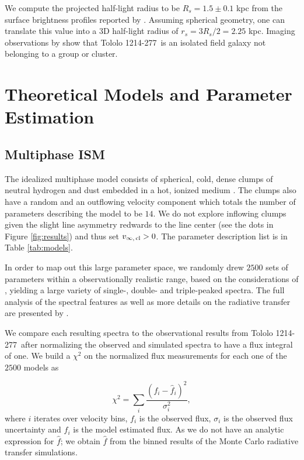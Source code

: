 \documentclass[a4paper,fleqn,usenatbib]{mnras}
\newcommand{\tol}{Tololo 1214-277}
\begin{document}
We compute the projected half-light radius to be $R_s=1.5\pm0.1$ kpc 
from the surface brightness profiles reported by \cite{2003A&A...410..481N}. 
Assuming spherical geometry, one can translate this value into a 3D
half-light radius of $r_s=3R_s/2=2.25$ kpc.
Imaging observations by \cite{2001AJ....121..169F} show that \tol\ is
an isolated field galaxy not belonging to a group or cluster. 






\section{Theoretical Models and Parameter Estimation}


\subsection{Multiphase ISM} 

The idealized multiphase model consists of spherical, cold, dense
clumps of neutral hydrogen and dust embedded in a hot, ionized
medium \citep{Gronke2016}. 
The clumps also have a random and an outflowing velocity
component which totals the number of parameters describing the model
to be $14$.
We do not explore inflowing clumps given the slight line asymmetry
redwards to the line center (see the dots in Figure \ref{fig:results})
and thus set $v_{\infty,\,{\rm cl}}>0$.
The parameter description list is in Table \ref{tab:models}.


In order to map out this large parameter space, we randomly drew
$2500$ sets of parameters within a observationally realistic range,
based on the considerations of \citet{Laursen2013ApJ...766..124L}, 
yielding a large variety of single-, double- and triple-peaked
spectra. 
The full analysis of the spectral features as well as
more details on the radiative transfer are presented by
\citet{Gronke2016}.    

We compare each resulting spectra to the observational results from
\tol\ after normalizing the observed and simulated spectra to have a 
flux integral of one.
We build a $\chi^2$ on the normalized flux measurements for each one
of the $2500$ models as

\begin{equation}
\chi^2 = \sum_{i} \frac{({f}_i - \hat{f}_i)^2}{\sigma_i^2}, 
\label{eq:chi2}
\end{equation}
%
where $i$ iterates over velocity bins, $f_{i}$ is the observed flux,
$\sigma_i$ is the observed flux uncertainty and $\hat{f}_i$ is the
model estimated flux.
As we do not have an analytic expression for $\hat{f}$;
we obtain $\hat{f}$ from the binned results of the Monte Carlo radiative transfer simulations.
\end{document}
